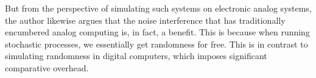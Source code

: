 But from the perspective of simulating such systems on electronic analog systems, the author likewise argues that the noise interference that has traditionally encumbered analog computing is, in fact, a benefit. This is because when running stochastic processes, we essentially get randomness for free. This is in contrast to simulating randomness in digital computers, which imposes significant comparative overhead. 










